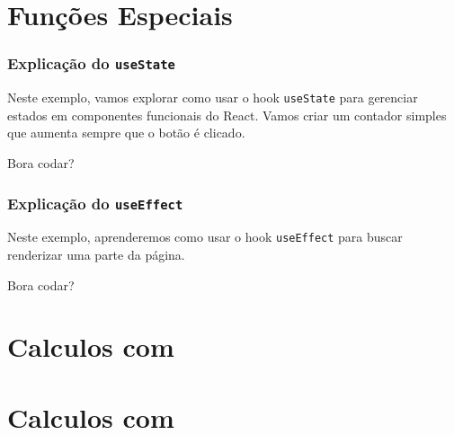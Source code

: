 \documentclass[13pt, xcolor={dvipsnames,svgnames}, portuguese]{beamer}
\begin{document}
\section{Funções Especiais}
\begin{frame}
\frametitle{Explicação do \texttt{useState}}
Neste exemplo, vamos explorar como usar o hook \texttt{useState} para gerenciar estados em componentes funcionais do React. Vamos criar um contador simples que aumenta sempre que o botão é clicado.

Bora codar?
\end{frame}



\begin{frame}
\frametitle{Explicação do  \texttt{useEffect}}
Neste exemplo, aprenderemos como usar o hook \texttt{useEffect} para buscar renderizar uma parte da página. 

Bora codar?
\end{frame}

\section{Calculos com }



\section{Calculos com }










\end{document}

